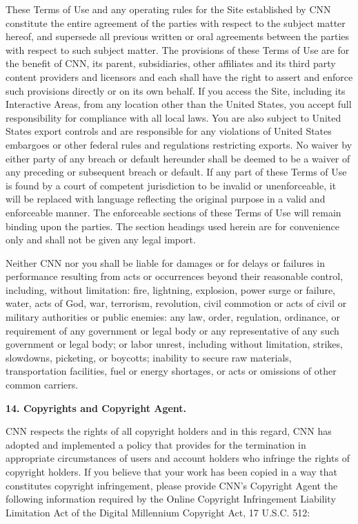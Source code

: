 These Terms of Use and any operating rules for the Site established by
CNN constitute the entire agreement of the parties with respect to the
subject matter hereof, and supersede all previous written or oral
agreements between the parties with respect to such subject matter. The
provisions of these Terms of Use are for the benefit of CNN, its parent,
subsidiaries, other affiliates and its third party content providers and
licensors and each shall have the right to assert and enforce such
provisions directly or on its own behalf. If you access the Site,
including its Interactive Areas, from any location other than the United
States, you accept full responsibility for compliance with all local
laws. You are also subject to United States export controls and are
responsible for any violations of United States embargoes or other
federal rules and regulations restricting exports. No waiver by either
party of any breach or default hereunder shall be deemed to be a waiver
of any preceding or subsequent breach or default. If any part of these
Terms of Use is found by a court of competent jurisdiction to be invalid
or unenforceable, it will be replaced with language reflecting the
original purpose in a valid and enforceable manner. The enforceable
sections of these Terms of Use will remain binding upon the parties. The
section headings used herein are for convenience only and shall not be
given any legal import.

Neither CNN nor you shall be liable for damages or for delays or
failures in performance resulting from acts or occurrences beyond their
reasonable control, including, without limitation: fire, lightning,
explosion, power surge or failure, water, acts of God, war, terrorism,
revolution, civil commotion or acts of civil or military authorities or
public enemies: any law, order, regulation, ordinance, or requirement of
any government or legal body or any representative of any such
government or legal body; or labor unrest, including without limitation,
strikes, slowdowns, picketing, or boycotts; inability to secure raw
materials, transportation facilities, fuel or energy shortages, or acts
or omissions of other common carriers.

\textbf{14. Copyrights and Copyright Agent.}

CNN respects the rights of all copyright holders and in this regard, CNN
has adopted and implemented a policy that provides for the termination
in appropriate circumstances of users and account holders who infringe
the rights of copyright holders. If you believe that your work has been
copied in a way that constitutes copyright infringement, please provide
CNN's Copyright Agent the following information required by the Online
Copyright Infringement Liability Limitation Act of the Digital
Millennium Copyright Act, 17 U.S.C. 512:

